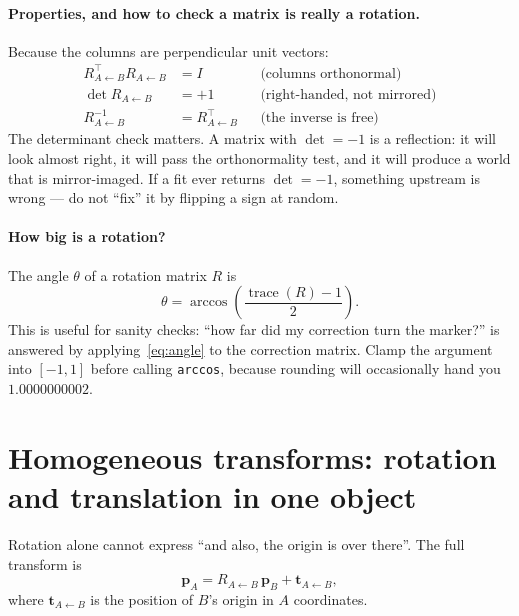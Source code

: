 \documentclass[11pt,a4paper]{article}
\newcommand{\R}[2]{R_{#1 \leftarrow #2}}
\newcommand{\vt}[1]{\mathbf{#1}}
\begin{document}
\paragraph{Properties, and how to check a matrix is really a rotation.}
Because the columns are perpendicular unit vectors:
\begin{align}
  \R{A}{B}^{\!\top} \R{A}{B} &= I  &&\text{(columns orthonormal)}\\
  \det \R{A}{B} &= +1            &&\text{(right-handed, not mirrored)}\\
  \R{A}{B}^{-1} &= \R{A}{B}^{\!\top} &&\text{(the inverse is free)}
\end{align}
The determinant check matters. A matrix with $\det = -1$ is a reflection: it will look
almost right, it will pass the orthonormality test, and it will produce a world that is
mirror-imaged. If a fit ever returns $\det = -1$, something upstream is wrong --- do not
``fix'' it by flipping a sign at random.

\paragraph{How big is a rotation?} The angle $\theta$ of a rotation matrix $R$ is
\begin{equation}
  \theta = \arccos\!\left( \frac{\operatorname{trace}(R) - 1}{2} \right).
  \label{eq:angle}
\end{equation}
This is useful for sanity checks: ``how far did my correction turn the marker?'' is
answered by applying~\eqref{eq:angle} to the correction matrix. Clamp the argument into
$[-1,1]$ before calling \texttt{arccos}, because rounding will occasionally hand you
$1.0000000002$.

\section{Homogeneous transforms: rotation and translation in one object}

Rotation alone cannot express ``and also, the origin is over there''. The full transform
is
\begin{equation}
  \vt{p}_A = \R{A}{B}\,\vt{p}_B + \vt{t}_{A\leftarrow B},
\end{equation}
where $\vt{t}_{A\leftarrow B}$ is the position of $B$'s origin in $A$ coordinates.
\end{document}
